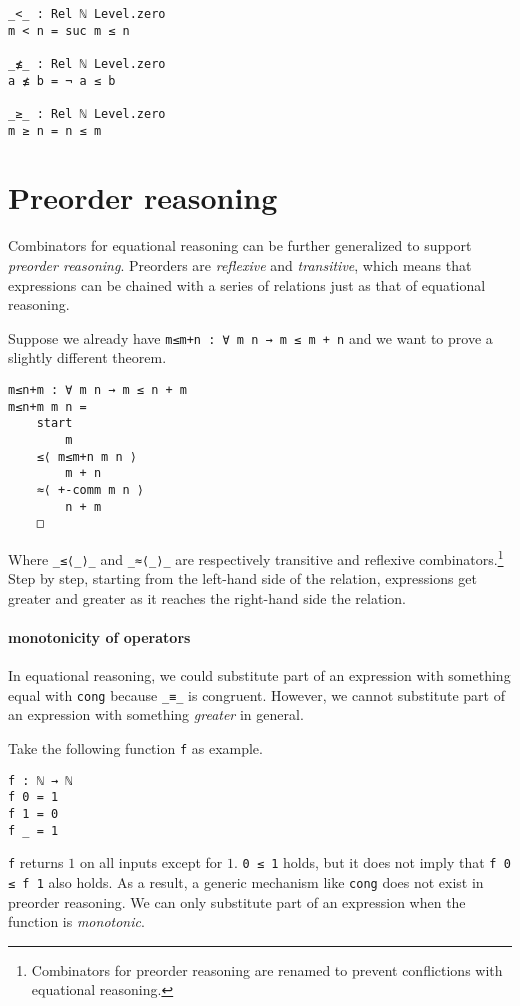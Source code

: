 \documentclass[../thesis.tex]{subfiles}
\begin{document}
\begin{lstlisting}
_<_ : Rel ℕ Level.zero
m < n = suc m ≤ n

_≰_ : Rel ℕ Level.zero
a ≰ b = ¬ a ≤ b

_≥_ : Rel ℕ Level.zero
m ≥ n = n ≤ m
\end{lstlisting}

\section{Preorder reasoning}

Combinators for equational reasoning can be further generalized to support \textit{preorder reasoning}.
Preorders are \textit{reflexive} and \textit{transitive},
which means that expressions can be chained with a series of relations just as that of
equational reasoning.

Suppose we already have {\lstinline|m≤m+n : ∀ m n → m ≤ m + n|} and we want to
prove a slightly different theorem.

\begin{lstlisting}
m≤n+m : ∀ m n → m ≤ n + m
m≤n+m m n =
    start
        m
    ≤⟨ m≤m+n m n ⟩
        m + n
    ≈⟨ +-comm m n ⟩
        n + m
    □
\end{lstlisting}

Where {\lstinline|_≤⟨_⟩_|} and {\lstinline|_≈⟨_⟩_|} are respectively transitive
and reflexive combinators.\footnote{Combinators for preorder reasoning are
renamed to prevent conflictions with equational reasoning.}
Step by step, starting from the left-hand side of the relation, expressions get
greater and greater as it reaches the right-hand side the relation.

\paragraph{monotonicity of operators}

In equational reasoning, we could substitute part of an expression with something
equal with {\lstinline|cong|} because {\lstinline|_≡_|} is congruent.
However, we cannot substitute part of an expression with something \textit{greater}
in general.

Take the following function {\lstinline|f|} as example.

\begin{lstlisting}
f : ℕ → ℕ
f 0 = 1
f 1 = 0
f _ = 1
\end{lstlisting}

{\lstinline|f|} returns $ 1 $ on all inputs except for $ 1 $.
{\lstinline|0 ≤ 1|} holds, but it does not imply that {\lstinline|f 0 ≤ f 1|} also holds.
As a result, a generic mechanism like {\lstinline|cong|} does not exist in preorder reasoning.
We can only substitute part of an expression when the function is \textit{monotonic}.
\end{document}
